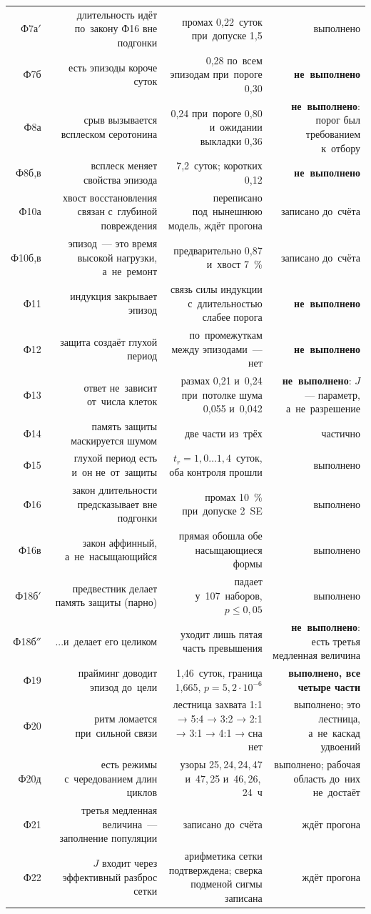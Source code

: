 \documentclass[11pt,a4paper,landscape,twocolumn]{article}
\begin{document}
{\begin{tabular}{@{}R{0.05}R{0.40}R{0.31}R{0.17}@{}}
Ф7а$'$ & длительность идёт по~закону Ф16 вне подгонки & промах 0,22~суток при~допуске 1,5 & выполнено\\
Ф7б & есть эпизоды короче суток & 0,28 по~всем эпизодам при~пороге 0,30 & \textbf{не~выполнено}\\
Ф8а & срыв вызывается всплеском серотонина & 0,24 при~пороге 0,80 и~ожидании выкладки 0,36 & \textbf{не~выполнено}: порог был требованием к~отбору\\
Ф8б,в & всплеск меняет свойства эпизода & 7,2~суток; коротких 0,12 & \textbf{не~выполнено}\\
Ф10а & хвост восстановления связан с~глубиной повреждения & переписано под~нынешнюю модель, ждёт прогона & записано до~счёта\\
Ф10б,в & эпизод~— это время высокой нагрузки, а~не~ремонт & предварительно 0,87 и~хвост 7~\% & записано до~счёта\\
Ф11 & индукция закрывает эпизод & связь силы индукции с~длительностью слабее порога & \textbf{не~выполнено}\\
Ф12 & защита создаёт глухой период & по~промежуткам между эпизодами~— нет & \textbf{не~выполнено}\\
Ф13 & ответ не~зависит от~числа клеток & размах 0,21 и~0,24 при~потолке шума 0,055 и~0,042 & \textbf{не~выполнено}: $J$~— параметр, а~не~разрешение\\
Ф14 & память защиты маскируется шумом & две части из~трёх & частично\\
Ф15 & глухой период есть и~он не~от~защиты & $t_r=1{,}0\dots1{,}4$~суток, оба контроля прошли & выполнено\\
Ф16 & закон длительности предсказывает вне подгонки & промах 10~\% при~допуске 2~SE & выполнено\\
Ф16в & закон аффинный, а~не~насыщающийся & прямая обошла обе насыщающиеся формы & выполнено\\
Ф18б$'$ & предвестник делает память защиты (парно) & падает у~107~наборов, $p\le0{,}05$ & выполнено\\
Ф18б$''$ & ...и~делает его целиком & уходит лишь пятая часть превышения & \textbf{не~выполнено}: есть третья медленная величина\\
Ф19 & прайминг доводит эпизод до~цели & 1,46~суток, граница 1,665, $p=5{,}2\cdot10^{-6}$ & \textbf{выполнено, все четыре части}\\
Ф20 & ритм ломается при~сильной связи & лестница захвата 1:1 → 5:4 → 3:2 → 2:1 → 3:1 → 4:1 → сна нет & выполнено; это лестница, а~не~каскад удвоений\\
Ф20д & есть режимы с~чередованием длин циклов & узоры 25,\,24,\,24,\,47 и~47,\,25 и~46,\,26,\,24~ч & выполнено; рабочая область до~них не~достаёт\\
Ф21 & третья медленная величина~— заполнение популяции & записано до~счёта & ждёт прогона\\
Ф22 & $J$ входит через эффективный разброс сетки & арифметика сетки подтверждена; сверка подменой сигмы записана & ждёт прогона\\
\bottomrule
\end{tabular}}
\end{document}
